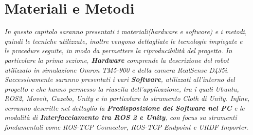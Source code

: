 \documentclass[11pt]{report}
\begin{document}

\newpage
\chapter{Materiali e Metodi}
\textit{In questo capitolo saranno presentati i materiali(hardware e software) e i metodi, quindi le tecniche utilizzate, inoltre vengono dettagliate le tecnologie impiegate e le procedure seguite, in modo da permettere la riproducibilità del progetto. In particolare la prima sezione, \textbf{Hardware} comprende la descrizione del robot utilizzato in simulazione Omron TM5-900 e della camera RealSense D435i. Successivamente saranno presentati i vari \textbf{Software}, utilizzati all'interno del progetto e che hanno permesso la riuscita dell'applicazione, tra i quali Ubuntu, ROS2, Moveit, Gazebo, Unity e in particolare lo strumento Cloth di Unity. Infine, verranno descritte nel dettaglio la \textbf{Predisposizione dei Software nel PC} e le modalità di \textbf{Interfacciamento tra ROS 2 e Unity}, con focus su strumenti fondamentali come ROS-TCP Connector, ROS-TCP Endpoint e URDF Importer.}
\end{document}
